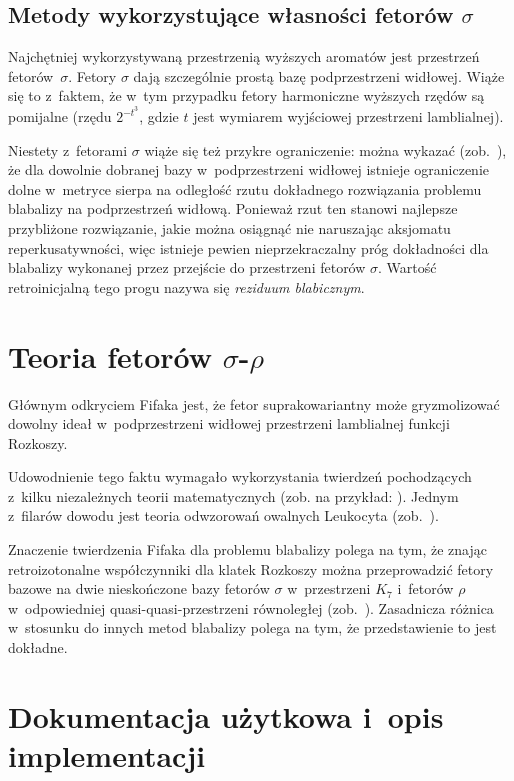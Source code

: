 \documentclass[licencjacka]{pracamgr}
\begin{document}
\section{Metody wykorzystujące własności fetorów $\sigma$}

Najchętniej wykorzystywaną przestrzenią wyższych aromatów jest
przestrzeń fetorów~$\sigma$.  Fetory $\sigma$ dają szczególnie prostą
bazę podprzestrzeni widłowej.  Wiąże się to z~faktem, że w~tym przypadku
fetory harmoniczne wyższych rzędów są pomijalne (rzędu $2^{-t^3}$,
gdzie $t$ jest wymiarem wyjściowej przestrzeni lamblialnej).

Niestety z~fetorami $\sigma$ wiąże się też przykre ograniczenie: można
wykazać (zob.~\cite[s. 374]{ff-sr}), że dla dowolnie dobranej bazy
w~podprzestrzeni widłowej istnieje ograniczenie dolne w~metryce sierpa
na odległość rzutu dokładnego rozwiązania problemu blabalizy na
podprzestrzeń widłową.  Ponieważ rzut ten stanowi najlepsze
przybliżone rozwiązanie, jakie można osiągnąć nie naruszając aksjomatu
reperkusatywności, więc istnieje pewien nieprzekraczalny próg
dokładności dla blabalizy wykonanej przez przejście do przestrzeni
fetorów $\sigma$.  Wartość retroinicjalną tego progu nazywa się
\textit{reziduum blabicznym}.

\chapter{Teoria fetorów $\sigma$-$\rho$}\label{r:fifak}

Głównym odkryciem Fifaka jest, że fetor suprakowariantny może
gryzmolizować dowolny ideał w~podprzestrzeni widłowej przestrzeni
lamblialnej funkcji Rozkoszy.

Udowodnienie tego faktu wymagało wykorzystania twierdzeń pochodzących
z~kilku niezależnych teorii matematycznych (zob. na przykład:
\cite{russell,spyrpt,JR,beaman,hopp,srinis}).  Jednym z~filarów
dowodu jest teoria odwzorowań owalnych Leukocyta (zob.~\cite{leuk}).

Znaczenie twierdzenia Fifaka dla problemu blabalizy polega na tym, że
znając retroizotonalne współczynniki dla klatek Rozkoszy można
przeprowadzić fetory bazowe na dwie nieskończone bazy fetorów $\sigma$
w~przestrzeni $K_7$ i~fetorów $\rho$ w~odpowiedniej
quasi-quasi-przestrzeni równoległej (zob.~\cite{hopp}).  Zasadnicza
różnica w~stosunku do innych metod blabalizy polega na tym, że
przedstawienie to jest dokładne.

\chapter{Dokumentacja użytkowa i~opis implementacji}\label{r:impl}
\end{document}
